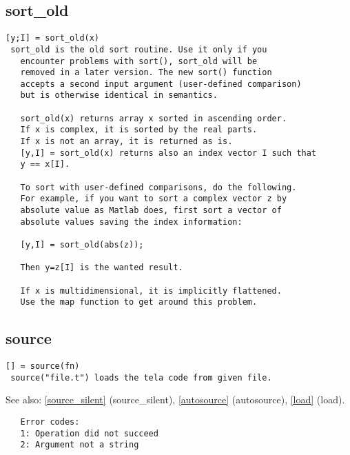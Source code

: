 \documentclass[a4paper]{article}
\begin{document}
\subsection{sort\_old\label{sort_old}}

\begin{tscreen}
\begin{verbatim}
[y;I] = sort_old(x)
 sort_old is the old sort routine. Use it only if you
   encounter problems with sort(), sort_old will be
   removed in a later version. The new sort() function
   accepts a second input argument (user-defined comparison)
   but is otherwise identical in semantics.
   
   sort_old(x) returns array x sorted in ascending order.
   If x is complex, it is sorted by the real parts.
   If x is not an array, it is returned as is.
   [y,I] = sort_old(x) returns also an index vector I such that
   y == x[I].

   To sort with user-defined comparisons, do the following.
   For example, if you want to sort a complex vector z by
   absolute value as Matlab does, first sort a vector of
   absolute values saving the index information:

   [y,I] = sort_old(abs(z));

   Then y=z[I] is the wanted result.

   If x is multidimensional, it is implicitly flattened.
   Use the map function to get around this problem.
\end{verbatim}
\end{tscreen}





\subsection{source\label{source}}

\begin{tscreen}
\begin{verbatim}
[] = source(fn)
 source("file.t") loads the tela code from given file.
\end{verbatim}

See also: \ref{source_silent} {(source\_silent)}, \ref{autosource} {(autosource)}, \ref{load} {(load)}.
\begin{verbatim}
   Error codes:
   1: Operation did not succeed
   2: Argument not a string 
\end{verbatim}
\end{tscreen}
\end{document}
